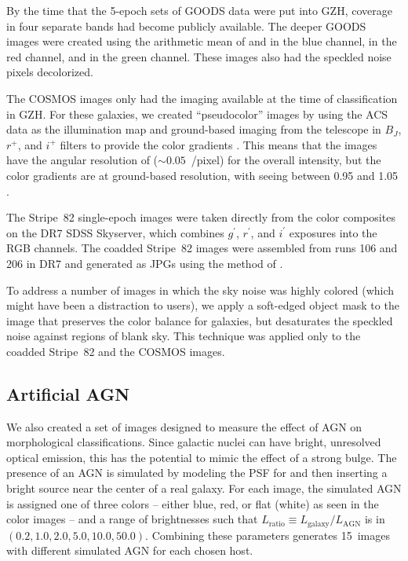 \documentclass[twocolumn]{aastex6}
\begin{document}
By the time that the 5-epoch sets of GOODS data were put into GZH, coverage in four separate \hst{} bands had become publicly available. The deeper GOODS images were created using the arithmetic mean of \Bband{} and \Vband in the blue channel, \Iband{} in the red channel, and \zband in the green channel. These images also had the speckled noise pixels decolorized. 

The COSMOS images only had the \Iband{} imaging available at the time of classification in GZH. For these galaxies, we created ``pseudocolor'' images by using the ACS \Iband{} data as the illumination map and ground-based imaging from the \subaru{} telescope in $B_J$, $r^+$, and $i^+$ filters to provide the color gradients \citep[see][for further details]{gri12}. This means that the images have the angular resolution of \hst{} ($\sim0.05$~\arcsec/pixel) for the overall intensity, but the color gradients are at ground-based resolution, with seeing between 0\arcsec.95 and 1\arcsec.05 \citep{tan07}.

The Stripe~82 single-epoch images were taken directly from the color composites on the DR7 SDSS Skyserver, which combines $g^{\prime}$, $r^{\prime}$, and $i^{\prime}$ exposures into the RGB channels. The coadded Stripe~82 images were assembled from runs 106 and 206 in DR7 and generated as JPGs using the method of \citet{lup04}.

To address a number of images in which the sky noise was highly colored (which might have been a distraction to users), we apply a soft-edged object mask to the image that preserves the color balance for galaxies, but desaturates the speckled noise against regions of blank sky. This technique was applied only to the coadded Stripe~82 and the COSMOS images.

\subsection{Artificial AGN}

We also created a set of images designed to measure the effect of AGN on morphological classifications. Since galactic nuclei can have bright, unresolved optical emission, this has the potential to mimic the effect of a strong bulge. The presence of an AGN is simulated by modeling the PSF for \hst{} and then inserting a bright source near the center of a real galaxy. For each image, the simulated AGN is assigned one of three colors -- either blue, red, or flat (white) as seen in the color images -- and a range of brightnesses such that $L_\mathrm{ratio} \equiv L_\mathrm{galaxy}/L_\mathrm{AGN}$ is in $(0.2,1.0,2.0,5.0,10.0,50.0)$. Combining these parameters generates 15~images with different simulated AGN for each chosen host. 
\end{document}
